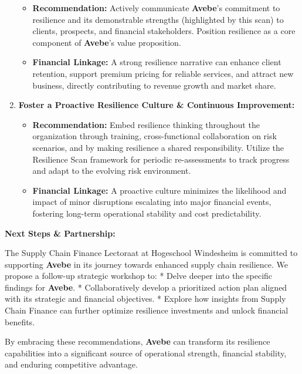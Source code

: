 \documentclass[
  oneside,
  open=any,
  fontsize=11pt]{scrbook}
\providecommand{\tightlist}{%
  \setlength{\itemsep}{0pt}\setlength{\parskip}{0pt}}
\begin{document}
\begin{enumerate}
  \begin{itemize}
  \tightlist
  \item
    \textbf{Recommendation:} Actively communicate \textbf{Avebe}'s
    commitment to resilience and its demonstrable strengths (highlighted
    by this scan) to clients, prospects, and financial stakeholders.
    Position resilience as a core component of \textbf{Avebe}'s value
    proposition.
  \item
    \textbf{Financial Linkage:} A strong resilience narrative can
    enhance client retention, support premium pricing for reliable
    services, and attract new business, directly contributing to revenue
    growth and market share.
  \end{itemize}
\item
  \textbf{Foster a Proactive Resilience Culture \& Continuous
  Improvement:}

  \begin{itemize}
  \tightlist
  \item
    \textbf{Recommendation:} Embed resilience thinking throughout the
    organization through training, cross-functional collaboration on
    risk scenarios, and by making resilience a shared responsibility.
    Utilize the Resilience Scan framework for periodic re-assessments to
    track progress and adapt to the evolving risk environment.
  \item
    \textbf{Financial Linkage:} A proactive culture minimizes the
    likelihood and impact of minor disruptions escalating into major
    financial events, fostering long-term operational stability and cost
    predictability.
  \end{itemize}
\end{enumerate}

\textbf{Next Steps \& Partnership:}

The Supply Chain Finance Lectoraat at Hogeschool Windesheim is committed
to supporting \textbf{Avebe} in its journey towards enhanced supply
chain resilience. We propose a follow-up strategic workshop to: * Delve
deeper into the specific findings for \textbf{Avebe}. * Collaboratively
develop a prioritized action plan aligned with its strategic and
financial objectives. * Explore how insights from Supply Chain Finance
can further optimize resilience investments and unlock financial
benefits.

By embracing these recommendations, \textbf{Avebe} can transform its
resilience capabilities into a significant source of operational
strength, financial stability, and enduring competitive advantage.
\end{document}
